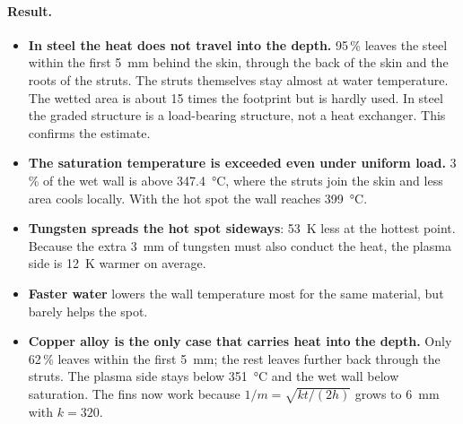 \documentclass[10pt,a4paper]{article}
\begin{document}
\paragraph{Result.}
\begin{itemize}
\item \textbf{In steel the heat does not travel into the depth.} 95\,\% leaves the steel within the first \SI{5}{mm} behind the skin, through the back of the skin and the roots of the struts. The struts themselves stay almost at water temperature. The wetted area is about 15 times the footprint but is hardly used. In steel the graded structure is a load-bearing structure, not a heat exchanger. This confirms the estimate.
\item \textbf{The saturation temperature is exceeded even under uniform load.} 3\,\% of the wet wall is above \SI{347.4}{\celsius}, where the struts join the skin and less area cools locally. With the hot spot the wall reaches \SI{399}{\celsius}.
\item \textbf{Tungsten spreads the hot spot sideways}: \SI{53}{K} less at the hottest point. Because the extra \SI{3}{mm} of tungsten must also conduct the heat, the plasma side is \SI{12}{K} warmer on average.
\item \textbf{Faster water} lowers the wall temperature most for the same material, but barely helps the spot.
\item \textbf{Copper alloy is the only case that carries heat into the depth.} Only 62\,\% leaves within the first \SI{5}{mm}; the rest leaves further back through the struts. The plasma side stays below \SI{351}{\celsius} and the wet wall below saturation. The fins now work because $1/m=\sqrt{k t/(2h)}$ grows to \SI{6}{mm} with $k=320$.
\end{itemize}
\end{document}
